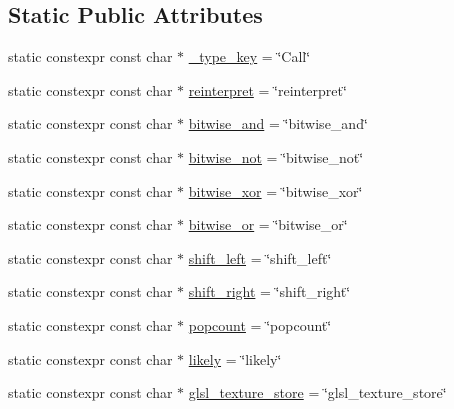 \subsection*{Static Public Attributes}
\begin{DoxyCompactItemize}
\item 
static constexpr const char $\ast$ \hyperlink{classtvm_1_1tir_1_1CallNode_a7b4d801def85ed1955a018cfb655a434}{\+\_\+type\+\_\+key} = \char`\"{}Call\char`\"{}
\item 
static constexpr const char $\ast$ \hyperlink{classtvm_1_1tir_1_1CallNode_afd029e12c4b28b7d6fea4a8bf27c6e50}{reinterpret} = \char`\"{}reinterpret\char`\"{}
\item 
static constexpr const char $\ast$ \hyperlink{classtvm_1_1tir_1_1CallNode_a45ce5bd93c09588f4961bf0683f8ec17}{bitwise\+\_\+and} = \char`\"{}bitwise\+\_\+and\char`\"{}
\item 
static constexpr const char $\ast$ \hyperlink{classtvm_1_1tir_1_1CallNode_a0a1a5c29a08482fe66ff955f35bde07b}{bitwise\+\_\+not} = \char`\"{}bitwise\+\_\+not\char`\"{}
\item 
static constexpr const char $\ast$ \hyperlink{classtvm_1_1tir_1_1CallNode_a615ddb84f79dfdf60b2bebba0e9c98fe}{bitwise\+\_\+xor} = \char`\"{}bitwise\+\_\+xor\char`\"{}
\item 
static constexpr const char $\ast$ \hyperlink{classtvm_1_1tir_1_1CallNode_abba6095e415d3cfd5006406c0f68758e}{bitwise\+\_\+or} = \char`\"{}bitwise\+\_\+or\char`\"{}
\item 
static constexpr const char $\ast$ \hyperlink{classtvm_1_1tir_1_1CallNode_a1a0078e5ee30ba236b8634e9aed8db24}{shift\+\_\+left} = \char`\"{}shift\+\_\+left\char`\"{}
\item 
static constexpr const char $\ast$ \hyperlink{classtvm_1_1tir_1_1CallNode_a4e768da713db6bcff8d7e6f51e4468e4}{shift\+\_\+right} = \char`\"{}shift\+\_\+right\char`\"{}
\item 
static constexpr const char $\ast$ \hyperlink{classtvm_1_1tir_1_1CallNode_a2fbfd414c61e8d2cf749882789625f16}{popcount} = \char`\"{}popcount\char`\"{}
\item 
static constexpr const char $\ast$ \hyperlink{classtvm_1_1tir_1_1CallNode_aa5557c1a8bf82ab81b5e916670583ba3}{likely} = \char`\"{}likely\char`\"{}
\item 
static constexpr const char $\ast$ \hyperlink{classtvm_1_1tir_1_1CallNode_adaa0f8782aaa0affe1b98e4353811149}{glsl\+\_\+texture\+\_\+store} = \char`\"{}glsl\+\_\+texture\+\_\+store\char`\"{}
\item 

\end{DoxyCompactItemize}
